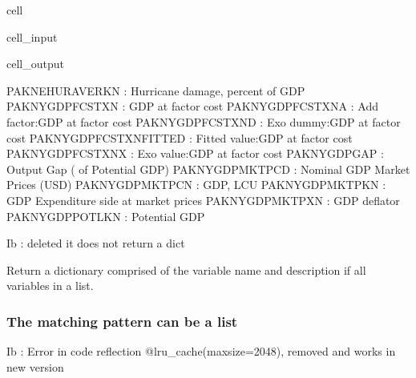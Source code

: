\documentclass[letterpaper,10pt,english]{jupyterBook}
\begin{document}
\begin{sphinxuseclass}{cell}\begin{sphinxVerbatimInput}

\begin{sphinxuseclass}{cell_input}
\begin{sphinxVerbatim}[commandchars=\\\{\}]
\PYG{p}{[}\PYG{p}{]}
\end{sphinxVerbatim}

\end{sphinxuseclass}\end{sphinxVerbatimInput}
\begin{sphinxVerbatimOutput}

\begin{sphinxuseclass}{cell_output}
\begin{sphinxVerbatim}[commandchars=\\\{\}]
PAKNEHURAVERKN\PYGZus{}       : Hurricane damage, percent of GDP
PAKNYGDPFCSTXN        : GDP at factor cost
PAKNYGDPFCSTXN\PYGZus{}A      : Add factor:GDP at factor cost
PAKNYGDPFCSTXN\PYGZus{}D      : Exo dummy:GDP at factor cost
PAKNYGDPFCSTXN\PYGZus{}FITTED : Fitted  value:GDP at factor cost
PAKNYGDPFCSTXN\PYGZus{}X      : Exo value:GDP at factor cost
PAKNYGDPGAP\PYGZus{}          : Output Gap (\PYGZpc{} of Potential GDP)
PAKNYGDPMKTPCD        : Nominal GDP Market Prices (USD)
PAKNYGDPMKTPCN        : GDP, LCU
PAKNYGDPMKTPKN        : GDP Expenditure side at market prices
PAKNYGDPMKTPXN        : GDP deflator
PAKNYGDPPOTLKN        : Potential GDP
\end{sphinxVerbatim}

\end{sphinxuseclass}\end{sphinxVerbatimOutput}

\end{sphinxuseclass}
\sphinxAtStartPar
Ib : deleted it does not return a dict 

\sphinxAtStartPar
Return a dictionary comprised of the variable name and description if all variables in a list.


\subsubsection{The matching pattern can be a list}
\label{\detokenize{content/06_WBModels/LoadingWBModel:the-matching-pattern-can-be-a-list}}
\sphinxAtStartPar
Ib : Error in code reflection @lru\_cache(maxsize=2048), removed and works in new version 
\end{document}
